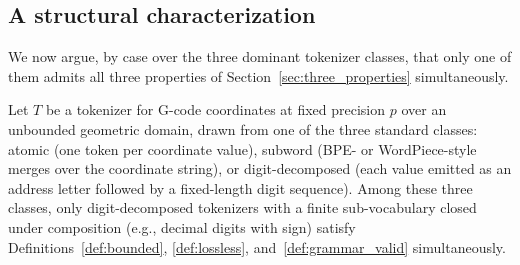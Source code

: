 \documentclass[sensors,article,submit,moreauthors,pdftex]{Definitions/mdpi}
\begin{document}
\subsection{A structural characterization}
\label{sec:impossibility}

We now argue, by case over the three dominant tokenizer classes, that only one of them admits all three properties of Section~\ref{sec:three_properties} simultaneously.

\begin{Proposition}
\label{prop:trichotomy}
Let $T$ be a tokenizer for G-code coordinates at fixed precision $p$ over an unbounded geometric domain, drawn from one of the three standard classes: atomic (one token per coordinate value), subword (BPE- or WordPiece-style merges over the coordinate string), or digit-decomposed (each value emitted as an address letter followed by a fixed-length digit sequence). Among these three classes, only digit-decomposed tokenizers with a finite sub-vocabulary closed under composition (e.g., decimal digits with sign) satisfy Definitions~\ref{def:bounded}, \ref{def:lossless}, and~\ref{def:grammar_valid} simultaneously.
\end{Proposition}
\end{document}
